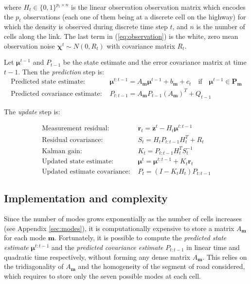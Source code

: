 \documentclass[11pt]{article}
\numberwithin{equation}{section}
\numberwithin{figure}{section}
\numberwithin{table}{section}
\begin{document}
\noindent where $H_{t}\in \{ 0,1 \}^{p_{t}\times n}$ is the linear observation observation matrix which encodes the $p_{t}$ observations (each one of them being at a discrete cell on the highway) for which the density is observed during discrete time step $t$, and $n$ is the number of cells along the link. The last term in (\ref{eq:observation}) is the white, zero mean observation noise $\boldsymbol\chi^{t} \sim N(0,R_{t})$ with covariance matrix $R_{t}$.

\noindent Let $\boldsymbol\mu^{t-1}$ and $P_{t-1}$ be the state estimate and the error covariance matrix at time $t-1$. Then the \textit{prediction} step is:
\begin{equation}
\begin{array}{ll}
\text{Predicted state estimate: } & \boldsymbol\mu^{t:t-1} = A_{\boldsymbol m} \boldsymbol\mu^{t-1} + b_{\boldsymbol m} + c_{t}
\quad\text{if}\quad\boldsymbol\mu^{t-1}\in\textbf{P}_{\boldsymbol m}\\
\text{Predicted covariance estimate: } & P_{t:t-1} = A_{\boldsymbol m}P_{t-1}(A_{\boldsymbol m})^{T} + Q_{t-1}
\end{array}
\label{eq:predict}
\end{equation}

\noindent The \textit{update} step is:

\begin{equation}
\begin{array}{ll}
\text{Measurement residual: } & \boldsymbol r_{t} = \boldsymbol z^{t} - H_{t}\boldsymbol\mu^{t:t-1}\\
\text{Residual covariance: } & S_{t} = H_{t}P_{t:t-1}H_{t}^{T}+R_{t}\\
\text{Kalman gain: } & K_{t} = P_{t:t-1}H_{t}^{T}S_{t}^{-1}\\
\text{Updated state estimate: } & \boldsymbol\mu^{t} = \boldsymbol\mu^{t:t-1} + K_{t} \boldsymbol r_{t}\\
\text{Updated estimate covariance: } & P_{t} = (I - K_{t}H_{t})P_{t:t-1}
\end{array}
\label{eq:update}
\end{equation}

\subsection{Implementation and complexity}

Since the number of modes grows exponentially as the number of cells increases (see Appendix \ref{sec:modes}), it is computationally expensive to store a matrix $A_{\boldsymbol m}$ for each mode $\boldsymbol m$. Fortunately, it is possible to compute the \textit{predicted state estimate} $\boldsymbol\mu^{t:t-1}$ and the \textit{predicted covariance estimate} $P_{t:t-1}$ in linear time and quadratic time respectively, without forming any dense matrix $A_{\boldsymbol m}$. This relies on the tridiagonality of $A_{\boldsymbol m}$ and the homogeneity of the segment of road considered, which requires to store only the seven possible modes at each cell\footnotemark.
\end{document}
